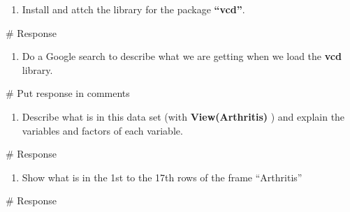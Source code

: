 \documentclass[
  letterpaper,
  DIV=11,
  numbers=noendperiod]{scrreprt}
\newenvironment{Shaded}{\begin{snugshade}}{\end{snugshade}}
\newcommand{\CommentTok}[1]{\textcolor[rgb]{0.37,0.37,0.37}{#1}}
\providecommand{\tightlist}{%
  \setlength{\itemsep}{0pt}\setlength{\parskip}{0pt}}\usepackage{longtable,booktabs,array}
\begin{document}

\begin{enumerate}
\def\labelenumi{\arabic{enumi}.}
\tightlist
\item
  Install and attch the library for the package \textbf{``vcd''}.
\end{enumerate}

\begin{Shaded}
\begin{Highlighting}[]
\CommentTok{\# Response}
\end{Highlighting}
\end{Shaded}

\begin{enumerate}
\def\labelenumi{\arabic{enumi}.}
\setcounter{enumi}{1}
\tightlist
\item
  Do a Google search to describe what we are getting when we load the
  \textbf{vcd} library.
\end{enumerate}

\begin{Shaded}
\begin{Highlighting}[]
\CommentTok{\# Put response in comments}
\end{Highlighting}
\end{Shaded}

\begin{enumerate}
\def\labelenumi{\arabic{enumi}.}
\setcounter{enumi}{2}
\tightlist
\item
  Describe what is in this data set (with \textbf{View(Arthritis)} ) and
  explain the variables and factors of each variable.
\end{enumerate}

\begin{Shaded}
\begin{Highlighting}[]
\CommentTok{\# Response}
\end{Highlighting}
\end{Shaded}

\begin{enumerate}
\def\labelenumi{\arabic{enumi}.}
\setcounter{enumi}{3}
\tightlist
\item
  Show what is in the 1st to the 17th rows of the frame ``Arthritis''
\end{enumerate}

\begin{Shaded}
\begin{Highlighting}[]
\CommentTok{\# Response}
\end{Highlighting}
\end{Shaded}
\end{document}
